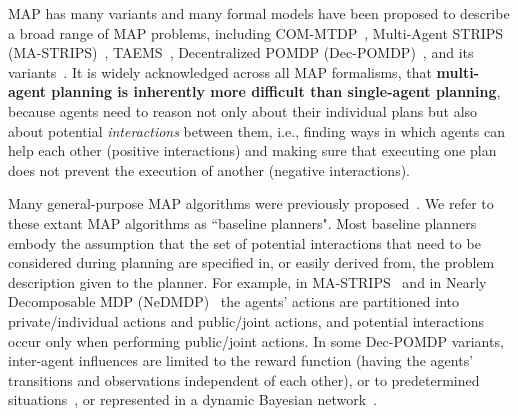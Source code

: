 \documentclass[11pt]{article}
\begin{document}





MAP has many variants and many formal models have been proposed to describe a broad range of MAP problems, including COM-MTDP~\cite{pynadath2002communicative}, Multi-Agent STRIPS (MA-STRIPS)~\cite{brafman2013complexity}, TAEMS~\cite{Horling-182,lesser2004evolution}, Decentralized POMDP (Dec-POMDP)~\cite{bernstein2002complexity}, and its variants~\cite{becker2004decentralized,roth2007exploiting,oliehoek2012influenceBased}. It is widely acknowledged across all MAP formalisms, that {\bf multi-agent planning is inherently more difficult than single-agent planning}, because agents need to reason not only about their individual plans but also about potential {\em interactions} between them, i.e., finding ways in which agents can help each other (positive interactions) and making sure that executing one plan does not prevent the execution of another (negative interactions).


Many general-purpose MAP algorithms were previously proposed~\cite{torreno2014fmap,nair2005networked,witwicki2010influence,spaan2011scaling,oliehoek2012influenceBased,wu2013monte,dibangoye2014exploiting,nissim2014distributed}. We refer to these extant MAP algorithms as ``baseline planners". 
Most baseline planners embody the assumption that the set of potential interactions that need to be considered during planning are specified in, or easily derived from, the problem description given to the planner. For example, in MA-STRIPS~\cite{brafman2013complexity} and in Nearly Decomposable MDP (NeDMDP)~\cite{kamar2013modeling} the agents' actions are partitioned into private/individual actions and public/joint actions, and potential interactions occur only when performing public/joint actions. In some Dec-POMDP variants, inter-agent influences are 
limited to the reward function (having the agents' transitions and observations independent of each other), or to predetermined situations~\cite{varakantham2009exploiting,melo2011decentralized}, or 
represented in a dynamic Bayesian network~\cite{nair2005networked,witwicki2010influence,oliehoek2012influenceBased}. 
\end{document}
